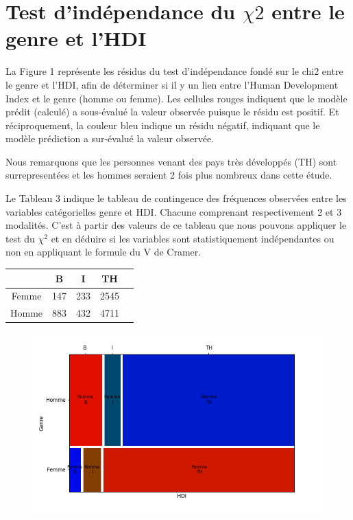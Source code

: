 \documentclass[12pt, a4paper, titlepage, table]{article}
\begin{document}
\section{Test d'indépendance du $\chi2$ entre le genre et l'HDI}

La Figure 1 représente les résidus du test d'indépendance fondé sur le chi2 entre le genre et l'HDI, afin de déterminer si il y un lien entre l'Human 
Development Index et le genre (homme ou femme).
Les cellules rouges indiquent que le modèle prédit (calculé) a sous-évalué la valeur observée puisque le résidu est positif. Et réciproquement, 
la couleur bleu indique un résidu négatif, indiquant que le modèle prédiction a sur-évalué la valeur observée. 

Nous remarquons que les personnes venant des pays très développés (TH) sont surrepresentées et les hommes seraient 2 fois plus nombreux dans cette étude. 

Le Tableau 3 indique le tableau de contingence des fréquences observées entre les variables catégorielles genre et HDI. 
Chacune comprenant respectivement 2 et 3 modalités. C'est à partir des valeurs de ce tableau que nous pouvons appliquer le test du $\chi^2$ et en déduire 
si les variables sont statistiquement indépendantes ou non en appliquant le formule du V de Cramer.

\begin{table}[H]
	\centering
	\fontsize{10}{12}\selectfont
	\begin{tabular}{|c|l|r|r|r|}
		\hline 
		\multicolumn{1}{|c|}{\textbf{}} & 
		\multicolumn{1}{c|}{\textbf{B}} &
		\multicolumn{1}{c|}{\textbf{I}} &
		\multicolumn{1}{c|}{\textbf{TH}} \\
		\hline
 			Femme&	147&	233&	2545\\
 			Homme&	883&	432&	4711\\
		\hline
	\end{tabular}
\end{table}

	\begin{figure}[H]
		\centering
		\includegraphics[width=1\textwidth]{../../graph/mosaic_contingence.png}
	\end{figure}
\end{document}
